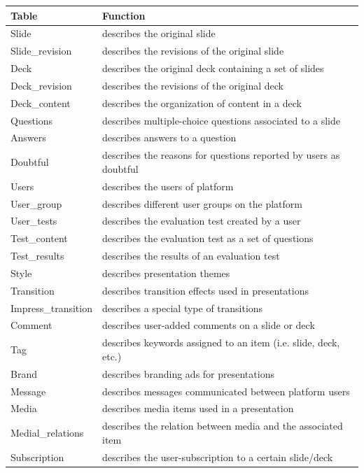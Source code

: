 \documentclass[ngerman,UKenglish,table]{scrbook}
\begin{document}
\begin{table}[!ht]

\begin{tabulary}{1\columnwidth}{ll}
\toprule
\textbf{Table} & \textbf{Function} \\
\midrule

Slide & describes the original slide\\
Slide\_revision & describes the revisions of the original slide\\
Deck & describes the original deck containing a set of slides\\
Deck\_revision & describes the revisions of the original deck\\
Deck\_content & describes the organization of content in a deck\\
Questions & describes multiple-choice questions associated to a slide\\
Answers & describes answers to a question\\
Doubtful & describes the reasons for questions reported by users as doubtful\\
Users & describes the users of platform\\
User\_group & describes different user groups on the platform\\
User\_tests & describes the evaluation test created by a user\\
Test\_content & describes the evaluation test as a set of questions\\
Test\_results & describes the results of an evaluation test\\
Style & describes presentation themes \\
Transition & describes transition effects used in presentations\\
Impress\_transition & describes a special type of transitions\\
Comment & describes user-added comments on a slide or deck\\
Tag& describes keywords assigned to an item (i.e. slide, deck, etc.)\\
Brand & describes branding ads for presentations\\
Message & describes messages communicated between platform users\\
Media& describes media items used in a presentation\\
Medial\_relations & describes the relation between media and the associated item\\
Subscription & describes the user-subscription to a certain slide/deck\\

\end{tabulary}
\end{table}
\end{document}
